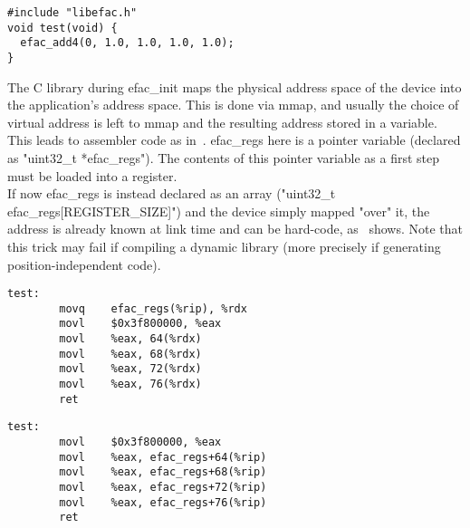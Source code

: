 \begin{lstlisting}[float=ht,caption=compilation demonstration code,label=lst:demo]
#include "libefac.h"
void test(void) {
  efac_add4(0, 1.0, 1.0, 1.0, 1.0);
}
\end{lstlisting}


The C library during efac\_init maps the physical address space of the
device into the application's address space. This is done via mmap,
and usually the choice of virtual address is left to mmap and the
resulting address stored in a variable.\\
This leads to assembler code as in~. efac\_regs
here is a pointer variable (declared as "uint32\_t *efac\_regs").
The contents of this pointer variable as a first step must be loaded
into a register.\\
If now efac\_regs is instead declared as an array
("uint32\_t efac\_regs[REGISTER\_SIZE]") and the device simply mapped
"over" it, the address is already known at link time and can be hard-code,
as~ shows. Note that this trick may fail if compiling
a dynamic library (more precisely if generating position-independent code).\\

\begin{lstlisting}[float=ht,caption={x86\_64 using register pointer (gcc -S -m64 -O3)},label={lst:regptr}]
test:
        movq    efac_regs(%rip), %rdx
        movl    $0x3f800000, %eax
        movl    %eax, 64(%rdx)
        movl    %eax, 68(%rdx)
        movl    %eax, 72(%rdx)
        movl    %eax, 76(%rdx)
        ret
\end{lstlisting}

\begin{lstlisting}[float=ht,caption={x86\_64 inlined (gcc -S -m64 -O3)},label={lst:inline64}]
test:
        movl    $0x3f800000, %eax
        movl    %eax, efac_regs+64(%rip)
        movl    %eax, efac_regs+68(%rip)
        movl    %eax, efac_regs+72(%rip)
        movl    %eax, efac_regs+76(%rip)
        ret
\end{lstlisting}

